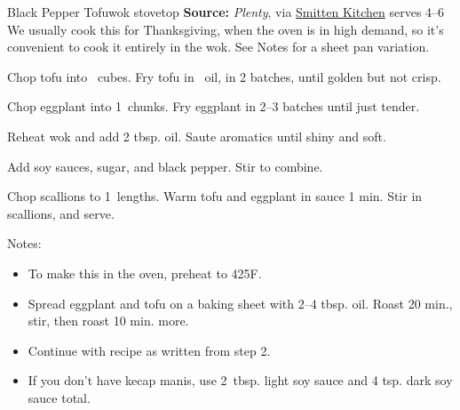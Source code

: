 \begin{recipe}{Black Pepper Tofu}{wok \hfill stovetop \hfill}{\textbf{Source:} \textit{Plenty}, via \href{https://smittenkitchen.com/2019/08/black-pepper-tofu-and-eggplant/}{Smitten Kitchen} \hfill serves 4--6}
  \freeform We usually cook this for Thanksgiving, when the oven is in high demand, so it's convenient to cook it entirely in the wok. See Notes for a sheet pan variation.

Chop tofu into \inch\ cubes. Fry tofu in \inch\ oil, in 2 batches, until golden but not crisp.

Chop eggplant into 1\inch\ chunks. Fry eggplant in 2--3 batches until just tender.

Reheat wok and add 2 tbsp. oil. Saute aromatics until shiny and soft.

Add soy sauces, sugar, and black pepper. Stir to combine.

Chop scallions to 1\inch\ lengths. Warm tofu and eggplant in sauce 1 min. Stir in scallions, and serve.

  \freeform Notes:
  \begin{itemize}
    \item To make this in the oven, preheat to 425\0F.
    \item Spread eggplant and tofu on a baking sheet with 2--4 tbsp. oil. Roast 20 min., stir, then roast 10 min. more.
    \item Continue with recipe as written from step 2.
    \item If you don't have kecap manis, use 2\ tbsp. light soy sauce and 4 tsp. dark soy sauce total.
  \end{itemize}
\end{recipe}